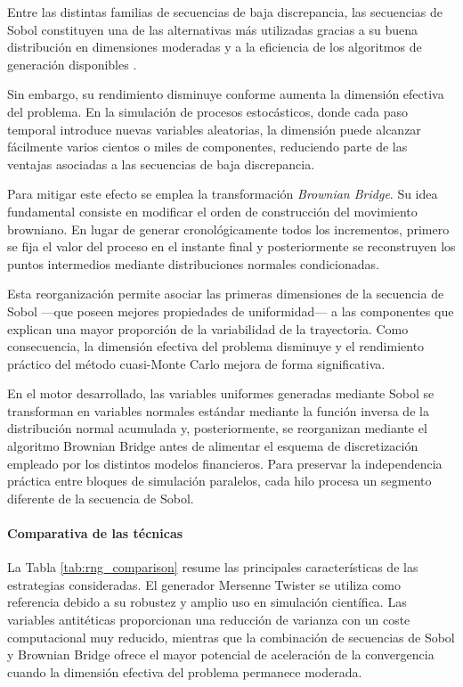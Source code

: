 \documentclass[11pt]{article}
\begin{document}
Entre las distintas familias de secuencias de baja discrepancia, las secuencias de Sobol constituyen una de las alternativas más utilizadas gracias a su buena distribución en dimensiones moderadas y a la eficiencia de los algoritmos de generación disponibles \cite{sobol1967on}.

Sin embargo, su rendimiento disminuye conforme aumenta la dimensión efectiva del problema. En la simulación de procesos estocásticos, donde cada paso temporal introduce nuevas variables aleatorias, la dimensión puede alcanzar fácilmente varios cientos o miles de componentes, reduciendo parte de las ventajas asociadas a las secuencias de baja discrepancia.

Para mitigar este efecto se emplea la transformación \emph{Brownian Bridge}. Su idea fundamental consiste en modificar el orden de construcción del movimiento browniano. En lugar de generar cronológicamente todos los incrementos, primero se fija el valor del proceso en el instante final y posteriormente se reconstruyen los puntos intermedios mediante distribuciones normales condicionadas.

Esta reorganización permite asociar las primeras dimensiones de la secuencia de Sobol ---que poseen mejores propiedades de uniformidad--- a las componentes que explican una mayor proporción de la variabilidad de la trayectoria. Como consecuencia, la dimensión efectiva del problema disminuye y el rendimiento práctico del método cuasi-Monte Carlo mejora de forma significativa.

En el motor desarrollado, las variables uniformes generadas mediante Sobol se transforman en variables normales estándar mediante la función inversa de la distribución normal acumulada y, posteriormente, se reorganizan mediante el algoritmo Brownian Bridge antes de alimentar el esquema de discretización empleado por los distintos modelos financieros. Para preservar la independencia práctica entre bloques de simulación paralelos, cada hilo procesa un segmento diferente de la secuencia de Sobol.

\paragraph{Comparativa de las técnicas}

La Tabla \ref{tab:rng_comparison} resume las principales características de las estrategias consideradas. El generador Mersenne Twister se utiliza como referencia debido a su robustez y amplio uso en simulación científica. Las variables antitéticas proporcionan una reducción de varianza con un coste computacional muy reducido, mientras que la combinación de secuencias de Sobol y Brownian Bridge ofrece el mayor potencial de aceleración de la convergencia cuando la dimensión efectiva del problema permanece moderada.
\end{document}
